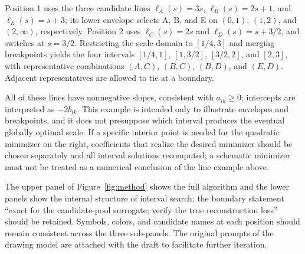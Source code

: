 Position 1 uses the three candidate lines $\ell_A(s)=3s$, $\ell_B(s)=2s+1$, and $\ell_E(s)=s+3$; its lower envelope selects A, B, and E on $(0,1)$, $(1,2)$, and $(2,\infty)$, respectively.
Position 2 uses $\ell_C(s)=2s$ and $\ell_D(s)=s+3/2$, and switches at $s=3/2$.
Restricting the scale domain to $[1/4,3]$ and merging breakpoints yields the four intervals $[1/4,1]$, $[1,3/2]$, $[3/2,2]$, and $[2,3]$, with representative combinations $(A,C)$, $(B,C)$, $(B,D)$, and $(E,D)$.
Adjacent representatives are allowed to tie at a boundary.

All of these lines have nonnegative slopes, consistent with $a_{ik}\ge0$; intercepts are interpreted as $-2b_{ik}$.
This example is intended only to illustrate envelopes and breakpoints, and it does not presuppose which interval produces the eventual globally optimal scale.
If a specific interior point is needed for the quadratic minimizer on the right, coefficients that realize the desired minimizer should be chosen separately and all interval solutions recomputed; a schematic minimizer must not be treated as a numerical conclusion of the line example above.

The upper panel of Figure~\ref{fig:method} shows the full algorithm and the lower panels show the internal structure of interval search; the boundary statement ``exact for the candidate-pool surrogate; verify the true reconstruction loss'' should be retained.
Symbols, colors, and candidate names at each position should remain consistent across the three sub-panels.
The original prompts of the drawing model are attached with the draft to facilitate further iteration.
